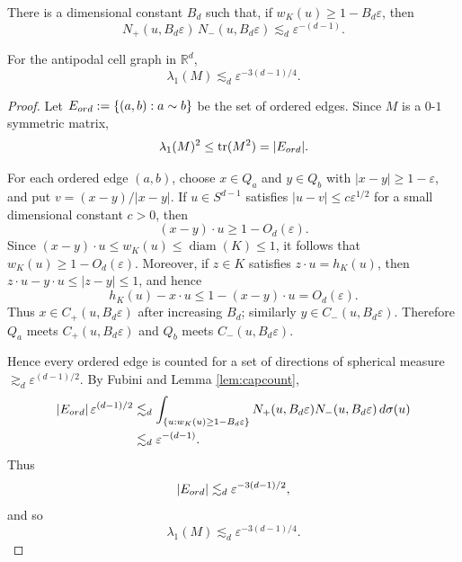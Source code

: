 \documentclass[10pt,a4paper]{amsart}
\newcommand{\R}{\mathbb R}
\newcommand{\diam}{\operatorname{diam}}
\newcommand{\eps}{\varepsilon}
\begin{document}
\begin{lemma}\label{lem:capcount}
There is a dimensional constant $B_d$ such that, if $w_K(u)\ge1-B_d\eps$, then
\[
   N_+(u,B_d\eps)\,N_-(u,B_d\eps)
   \lesssim_d
   \eps^{-(d-1)}.
\]
\end{lemma}

\begin{proposition}\label{prop:trace}
For the antipodal cell graph in $\R^d$,
\[
   \lambda_1(M)
   \lesssim_d
   \eps^{-3(d-1)/4}.
\]
\end{proposition}

\begin{proof}
Let $E_{\rm ord}:=\{(a,b):a\sim b\}$ be the set of ordered edges.  Since $M$ is a $0$-$1$ symmetric matrix,
\[
   \lambda_1(M)^2\le\operatorname{tr}(M^2)=|E_{\rm ord}|.
\]

\smallskip
\noindent
For each ordered edge $(a,b)$, choose $x\in Q_a$ and $y\in Q_b$ with $|x-y|\ge1-\eps$, and put $v=(x-y)/|x-y|$.  If $u\in S^{d-1}$ satisfies $|u-v|\le c\eps^{1/2}$ for a small dimensional constant $c>0$, then
\[
   (x-y)\cdot u\ge1-O_d(\eps).
\]
Since $(x-y)\cdot u\le w_K(u)\le\diam(K)\le1$, it follows that $w_K(u)\ge1-O_d(\eps)$.  Moreover, if $z\in K$ satisfies $z\cdot u=h_K(u)$, then $z\cdot u-y\cdot u\le |z-y|\le1$, and hence
\[
   h_K(u)-x\cdot u\le 1-(x-y)\cdot u=O_d(\eps).
\]
Thus $x\in C_+(u,B_d\eps)$ after increasing $B_d$; similarly $y\in C_-(u,B_d\eps)$.  Therefore $Q_a$ meets $C_+(u,B_d\eps)$ and $Q_b$ meets $C_-(u,B_d\eps)$.

\bigskip
\noindent
Hence every ordered edge is counted for a set of directions of spherical measure $\gtrsim_d\eps^{(d-1)/2}$.  By Fubini and Lemma \ref{lem:capcount},
\[
\begin{aligned}
   |E_{\rm ord}|\,\eps^{(d-1)/2}
   &\lesssim_d
   \int_{\{u:w_K(u)\ge1-B_d\eps\}}
   N_+(u,B_d\eps)N_-(u,B_d\eps)\,d\sigma(u)  \\
   &\lesssim_d
   \eps^{-(d-1)}.
\end{aligned}
\]
Thus
\[
   |E_{\rm ord}|\lesssim_d \eps^{-3(d-1)/2},
\]
and so
\[
   \lambda_1(M)\lesssim_d \eps^{-3(d-1)/4}.
\]
\end{proof}
\end{document}
